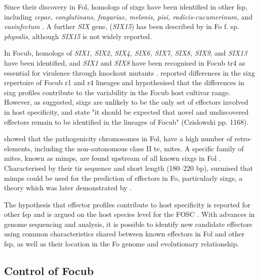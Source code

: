 Since their discovery in \ac{Fol}, homologs of \acp{sixg} have been identified in other \ac{fsp}, including \textit{cepae, conglutinans, fragariae, melonis, pisi, radicis-cucumerinum,} and \textit{vasinfectum} \parencite{Czislowski2018}. A further \textit{SIX} gene, (\textit{SIX15}) has been described by \textcite{Simbaqueba2018} in \acl{Fo} f. sp. \textit{physalis}, although \textit{SIX15} is not widely reported. 

In \ac{Focub}, homologs of \textit{SIX1, SIX2, SIX4, SIX6, SIX7, SIX8, SIX9}, and \textit{SIX13} have been identified, and \textit{SIX1} and \textit{SIX8} have been recognised in \ac{Focub} \ac{tr4} as essential for virulence through knockout mutants \parencite{ Widinugraheni2018, An2019}. \textcite{Czislowski2018} reported differences in the \ac{sixg} repertoire of \ac{Focub} \ac{r1} and \ac{r4} lineages and hypothesised that the differences in \ac{sixg} profiles contribute to the variability in the \ac{Focub} host cultivar range.  However, as suggested, \acp{sixg} are unlikely to be the only set of effectors involved in host specificity, and state "it should be expected that novel and undiscovered effectors remain to be identified in the lineages of \ac{Focub}" (Czislowski  pp. 1168).  

\textcite{Ma2010} showed that the pathogenicity chromosomes in \ac{Fol}, have a high number of retro-elements, including the non-autonomous class II \ac{te}, \ac{mites}. A specific family of \ac{mites}, known as \acp{mimp}, are found upstream of all known \acp{sixg} in \ac{Fol} \parencite{Schmidt2013}. Characterised by their \ac{tir} sequence and short length (180–220 \acs{bp}), \textcite{Schmidt2013} surmised that \acp{mimp} could be used for the prediction of effectors in \ac{Fo}, particularly \acp{sixg}, a theory which was later demonstrated by \textcite{Dam2016, Dam2017, Armitage2018, FoEC2}.  

The hypothesis that effector profiles contribute to host specificity is reported for other \ac{fsp} \parencite{Achari2021, Batson2021} and is argued on the host species level for the \ac{FOSC} \parencite{Dam2016}. With advances in genome sequencing and analysis, it is possible to identify new candidate effectors using common characteristics shared between known effectors in \ac{Fol} and other \ac{fsp}, as well as their location in the \ac{Fo} genome and evolutionary relationship.

\subsection{Control of \acl{Focub}}

